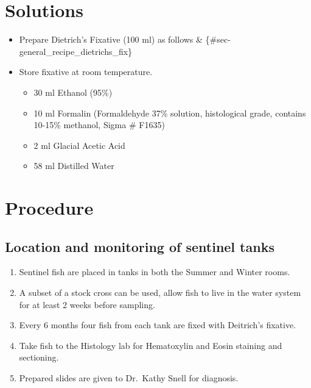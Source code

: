 \documentclass[
  letterpaper,
  DIV=11,
  numbers=noendperiod]{scrreprt}
\providecommand{\tightlist}{%
  \setlength{\itemsep}{0pt}\setlength{\parskip}{0pt}}\usepackage{longtable,booktabs,array}
\begin{document}
\hypertarget{solutions-24}{%
\section{Solutions}\label{solutions-24}}

\begin{itemize}
\tightlist
\item
  Prepare Dietrich's Fixative (100 ml) as follows \&
  \{\#sec-general\_recipe\_dietrichs\_fix\}
\item
  Store fixative at room temperature.

  \begin{itemize}
  \tightlist
  \item
    30 ml Ethanol (95\%)
  \item
    10 ml Formalin (Formaldehyde 37\% solution, histological grade,
    contains 10-15\% methanol, Sigma \# F1635)
  \item
    2 ml Glacial Acetic Acid
  \item
    58 ml Distilled Water
  \end{itemize}
\end{itemize}

\hypertarget{procedure-29}{%
\section{Procedure}\label{procedure-29}}

\hypertarget{location-and-monitoring-of-sentinel-tanks}{%
\subsection{Location and monitoring of sentinel
tanks}\label{location-and-monitoring-of-sentinel-tanks}}

\begin{enumerate}
\def\labelenumi{\arabic{enumi}.}
\tightlist
\item
  Sentinel fish are placed in tanks in both the Summer and Winter rooms.
\item
  A subset of a stock cross can be used, allow fish to live in the water
  system for at least 2 weeks before sampling.
\item
  Every 6 months four fish from each tank are fixed with Deitrich's
  fixative.
\item
  Take fish to the Histology lab for Hematoxylin and Eosin staining and
  sectioning.
\item
  Prepared slides are given to Dr.~Kathy Snell for diagnosis.
\end{enumerate}
\end{document}
